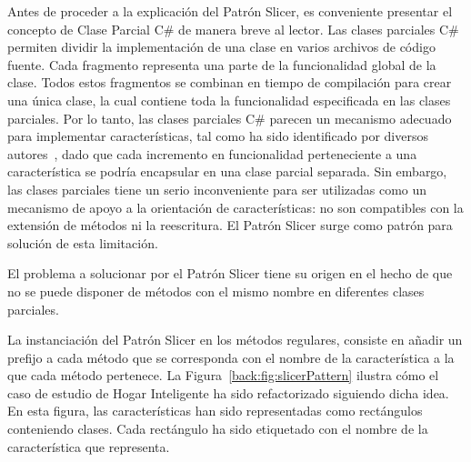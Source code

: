 Antes de proceder a la explicación del Patrón Slicer, es conveniente presentar el concepto de Clase Parcial C\# de manera breve al lector. Las clases parciales C\#~\cite{albahari:2010} permiten dividir la implementación de una clase en varios archivos de código fuente. Cada fragmento representa una parte de la funcionalidad global de la clase. Todos estos fragmentos se combinan en tiempo de compilación para crear una única clase, la cual contiene toda la funcionalidad especificada en las clases parciales. Por lo tanto, las clases parciales C\# parecen un mecanismo adecuado para implementar características, tal como ha sido identificado por diversos autores~\cite{laguna:2007,laguna:2010}, dado que cada incremento en funcionalidad perteneciente a una característica se podría encapsular en una clase parcial separada. Sin embargo, las clases parciales tiene un serio inconveniente para ser utilizadas como un mecanismo de apoyo a la orientación de características: no son compatibles con la extensión de métodos ni la reescritura. El Patrón Slicer surge como patrón para solución de esta limitación.

El problema a solucionar por el Patrón Slicer tiene su origen en el hecho de que no se puede disponer de métodos con el mismo nombre en diferentes clases parciales.

La instanciación del Patrón Slicer en los métodos regulares, consiste en añadir un prefijo a cada método que se corresponda con el nombre de la característica a la que cada método pertenece. La Figura~\ref{back:fig:slicerPattern} ilustra cómo el caso de estudio de Hogar Inteligente ha sido refactorizado siguiendo dicha idea. En esta figura, las características han sido representadas como rectángulos conteniendo clases. Cada rectángulo ha sido etiquetado con el nombre de la característica que representa.


